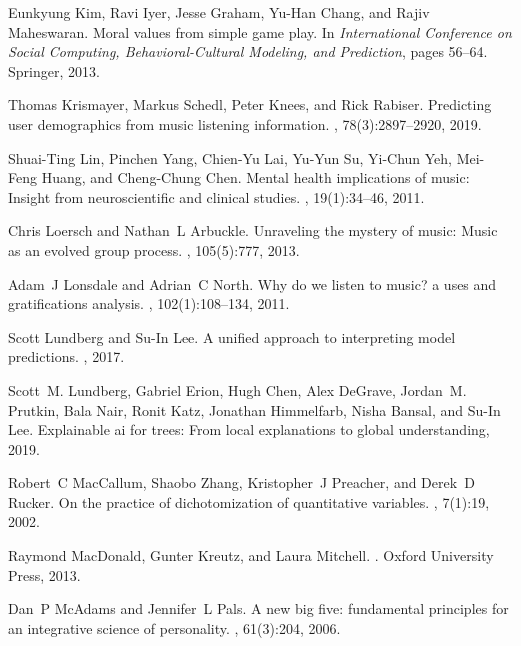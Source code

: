 \documentclass{article}
\begin{document}
\begin{thebibliography}{10}
Eunkyung Kim, Ravi Iyer, Jesse Graham, Yu-Han Chang, and Rajiv Maheswaran.
\newblock Moral values from simple game play.
\newblock In {\em International Conference on Social Computing,
  Behavioral-Cultural Modeling, and Prediction}, pages 56--64. Springer, 2013.

Thomas Krismayer, Markus Schedl, Peter Knees, and Rick Rabiser.
\newblock Predicting user demographics from music listening information.
, 78(3):2897--2920, 2019.

Shuai-Ting Lin, Pinchen Yang, Chien-Yu Lai, Yu-Yun Su, Yi-Chun Yeh, Mei-Feng
  Huang, and Cheng-Chung Chen.
\newblock Mental health implications of music: Insight from neuroscientific and
  clinical studies.
, 19(1):34--46, 2011.

Chris Loersch and Nathan~L Arbuckle.
\newblock Unraveling the mystery of music: Music as an evolved group process.
, 105(5):777, 2013.

Adam~J Lonsdale and Adrian~C North.
\newblock Why do we listen to music? a uses and gratifications analysis.
, 102(1):108--134, 2011.

Scott Lundberg and Su-In Lee.
\newblock A unified approach to interpreting model predictions.
, 2017.

Scott~M. Lundberg, Gabriel Erion, Hugh Chen, Alex DeGrave, Jordan~M. Prutkin,
  Bala Nair, Ronit Katz, Jonathan Himmelfarb, Nisha Bansal, and Su-In Lee.
\newblock Explainable ai for trees: From local explanations to global
  understanding, 2019.

Robert~C MacCallum, Shaobo Zhang, Kristopher~J Preacher, and Derek~D Rucker.
\newblock On the practice of dichotomization of quantitative variables.
, 7(1):19, 2002.

Raymond MacDonald, Gunter Kreutz, and Laura Mitchell.
.
\newblock Oxford University Press, 2013.

Dan~P McAdams and Jennifer~L Pals.
\newblock A new big five: fundamental principles for an integrative science of
  personality.
, 61(3):204, 2006.


\end{thebibliography}
\end{document}
